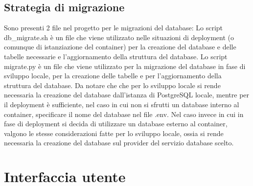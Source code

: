 \documentclass[12pt,a4paper,oneside]{report}
\begin{document}
\subsection{Strategia di migrazione}
Sono presenti 2 file nel progetto per le migrazioni del database:
Lo script db\_migrate.sh è un file che viene utilizzato nelle situazioni di deployment (o comunque di istanziazione del container) per la creazione del database e delle tabelle necessarie e l'aggiornamento della struttura del database.
Lo script migrate.py è un file che viene utilizzato per la migrazione del database in fase di sviluppo locale, per la creazione delle tabelle e per l'aggiornamento della struttura del database.
Da notare che che per lo sviluppo locale si rende necessaria la creazione del database dall'istanza di PostgreSQL locale, mentre per il deployment è sufficiente, nel caso in cui non si sfrutti un database interno al container, specificare il nome del database nel file .env.
Nel caso invece in cui in fase di deployment si decida di utilizzare un database esterno al container, valgono le stesse considerazioni fatte per lo sviluppo locale, ossia si rende necessaria la creazione del database sul provider del servizio database scelto.
\section{Interfaccia utente}
\end{document}

